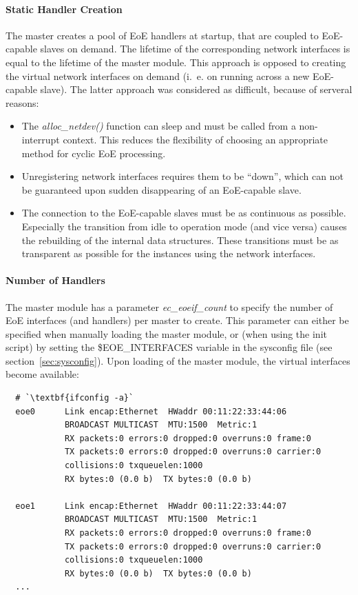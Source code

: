 \documentclass[a4paper,12pt,BCOR6mm,bibtotoc,idxtotoc]{scrbook}
\begin{document}
\paragraph{Static Handler Creation}

The master creates a pool of EoE handlers at startup, that are coupled
to EoE-capable slaves on demand. The lifetime of the corresponding
network interfaces is equal to the lifetime of the master module.
This approach is opposed to creating the virtual network interfaces on
demand (i.~e. on running across a new EoE-capable slave). The latter
approach was considered as difficult, because of serveral reasons:

\begin{itemize}
\item The \textit{alloc\_netdev()} function can sleep and must be
  called from a non-interrupt context. This reduces the flexibility of
  choosing an appropriate method for cyclic EoE processing.
\item Unregistering network interfaces requires them to be ``down'',
  which can not be guaranteed upon sudden disappearing of an
  EoE-capable slave.
\item The connection to the EoE-capable slaves must be as continuous
  as possible. Especially the transition from idle to operation mode
  (and vice versa) causes the rebuilding of the internal data
  structures. These transitions must be as transparent as possible for
  the instances using the network interfaces.
\end{itemize}

\paragraph{Number of Handlers}

The master module has a parameter \textit{ec\_eoeif\_count} to specify
the number of EoE interfaces (and handlers) per master to create. This
parameter can either be specified when manually loading the master
module, or (when using the init script) by setting the
\$EOE\_INTERFACES variable in the sysconfig file (see
section~\ref{sec:sysconfig}). Upon loading of the master module, the
virtual interfaces become available:

\begin{lstlisting}
  # `\textbf{ifconfig -a}`
  eoe0      Link encap:Ethernet  HWaddr 00:11:22:33:44:06
            BROADCAST MULTICAST  MTU:1500  Metric:1
            RX packets:0 errors:0 dropped:0 overruns:0 frame:0
            TX packets:0 errors:0 dropped:0 overruns:0 carrier:0
            collisions:0 txqueuelen:1000
            RX bytes:0 (0.0 b)  TX bytes:0 (0.0 b)

  eoe1      Link encap:Ethernet  HWaddr 00:11:22:33:44:07
            BROADCAST MULTICAST  MTU:1500  Metric:1
            RX packets:0 errors:0 dropped:0 overruns:0 frame:0
            TX packets:0 errors:0 dropped:0 overruns:0 carrier:0
            collisions:0 txqueuelen:1000
            RX bytes:0 (0.0 b)  TX bytes:0 (0.0 b)
  ...
\end{lstlisting}
\end{document}

